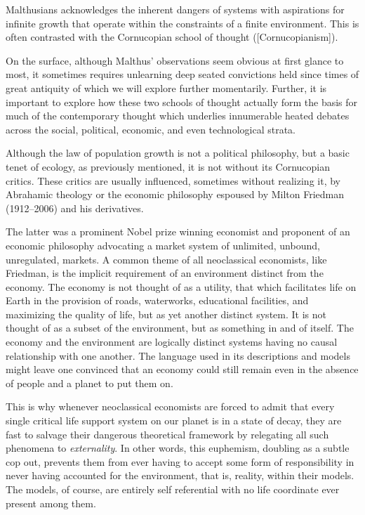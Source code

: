 Malthusians acknowledges the inherent dangers of systems with aspirations for infinite growth that operate within the constraints of a finite environment. This is often contrasted with the Cornucopian school of thought ([Cornucopianism]). 

On the surface, although Malthus' observations seem obvious at first glance to most, it sometimes requires unlearning deep seated convictions held since times of great antiquity of which we will explore further momentarily. Further, it is important to explore how these two schools of thought actually form the basis for much of the contemporary thought which underlies innumerable heated debates across the social, political, economic, and even technological strata.

Although the law of population growth is not a political philosophy, but a basic tenet of ecology, as previously mentioned, it is not without its Cornucopian critics. These critics are usually influenced, sometimes without realizing it, by Abrahamic theology or the economic philosophy espoused by Milton Friedman (1912--2006) and his derivatives.

The latter was a prominent Nobel prize winning economist and proponent of an economic philosophy advocating a market system of unlimited, unbound, unregulated, markets. A common theme of all neoclassical economists, like Friedman, is the implicit requirement of an environment distinct from the economy. The economy is not thought of as a utility, that which facilitates life on Earth in the provision of roads, waterworks, educational facilities, and maximizing the quality of life, but as yet another distinct system. It is not thought of as a subset of the environment, but as something in and of itself. The economy and the environment are logically distinct systems having no causal relationship with one another. The language used in its descriptions and models might leave one convinced that an economy could still remain even in the absence of people and a planet to put them on.

This is why whenever neoclassical economists are forced to admit that every single critical life support system on our planet is in a state of decay, they are fast to salvage their dangerous theoretical framework by relegating all such phenomena to {\it externality}. In other words, this euphemism, doubling as a subtle cop out, prevents them from ever having to accept some form of responsibility in never having accounted for the environment, that is, reality, within their models. The models, of course, are entirely self referential with no life coordinate ever present among them.

